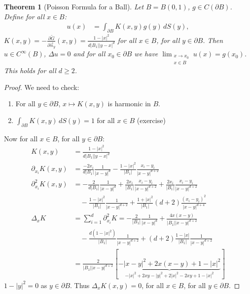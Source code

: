 \documentclass{report}
\theoremstyle{tommy}
\newtheorem{thm}[defn]{Theorem}
\begin{document}
\begin{thm}[Poisson Formula for a Ball] Let \(B = B(0,1)\), \(g \in C(\partial B)\). Define for all \(x \in B\):
  \begin{align*}
    u(x) &= \int_{\partial B} K(x,y) g(y) \, dS(y),
  \end{align*}
  \(K(x,y) = - \frac{\partial \tilde G}{\partial \vec{n}_y}(x,y) = \frac{1-|x|^2}{d|B_1||y-x|^d}\) for all \(x \in B\), for all \(y \in \partial B\). Then \(u \in C^\infty(B)\), \(\Delta u = 0\) and for all \(x_0 \in \partial B\) we have \(\lim_{\substack{x \to x_0 \\ x \in B}} u(x) = g(x_0)\). This holds for all \(d \ge 2\).
\end{thm}


\begin{proof}
  We need to check: \begin{enumerate}
    \item For all \(y \in \partial B\), \(x \mapsto K(x,y)\) is harmonic in \(B\).
    \item \(\int_{\partial B} K(x,y) \, dS(y) = 1\) for all \(x \in B\) (exercise)
  \end{enumerate}
  Now for all \(x \in B\), for all \(y \in \partial B\):
  \begin{align*}
    K(x,y) &= \frac{1-|x|^2}{d|B_1||y-x|^d} \\
    \partial_{x_i} K(x,y) &= \frac{-2x_i}{d|B_1|} \frac{1}{|x-y|^d} - \frac{1-|x|^2}{|B_1|} \frac{x_i - y_i}{|x-y|^{d+2}} \\
    \partial_{x_i}^2 K(x,y) &= - \frac{2}{d|B_1|} \frac{1}{|x-y|^d} + \frac{2 x_i}{|B_1|} \frac{x_i - y_i}{|x-y|^{d+2}} + \frac{2 x_i}{|B_1|} \frac{x_i - y_i}{|x-y|^{d+2}} \\
    &\quad - \frac{1-|x|^2}{|B_1|} \frac{1}{|x-y|^{d+2}} + \frac{1+|x|^2}{|B_1|} (d+2) \frac{(x_i-y_i)^2}{|x-y|^{d+4}}\\
    \Delta_x K &= \sum_{i=1}^d \partial_{x_i}^2 K = - \frac{2}{|B_1|} \frac{1}{|x-y|^d} + \frac{4 x(x-y)}{|B_1||x-y|^{d+2}} \\
    &\quad - \frac{d(1-|x|^2)}{|B_1|} \frac{1}{|x-y|^{d+2}} + (d+2) \frac{1-|x|}{|B_1|} \frac{1}{|x-y|^{d+2}} \\
    &= \frac{2}{|B_1||x-y|^{d+2}} [\underbrace{-|x-y|^2 + 2x(x-y) + 1-|x|^2}_{-|x|^2 + 2xy - |y|^2 + 2|x|^2 - 2xy + 1 - |x|^2}]
  \end{align*}
  \(1 - |y|^2 = 0\) as \(y \in \partial B\). Thus \(\Delta_x K(x,y) = 0\), for all \(x \in B\), for all \(y \in \partial B\).
\end{proof}
\end{document}
